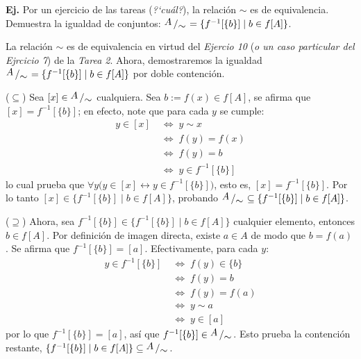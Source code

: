 \documentclass[letterpaper,DIV=14,headsepline,12pt]{scrartcl}
\makeatletter
\newcounter{Ejer}
\newcommand{\pts}{}
\newenvironment{ejercicio}[1]{\noindent
    \ifthenelse{\equal{#1}{1} \OR \equal{#1}{+1}}{\renewcommand{\pts}{\textbf{(#1 pt)}}}{\renewcommand{\pts}{\textbf{(#1 pts)}}}\textbf{Ej. \theEjer} \pts\stepcounter{Ejer}}{\vspace{.3cm}}
\newcommand{\quot}[2]{{\raisebox{.2em}{$#1$}\left/\raisebox{-.2em}{$#2$}\right.}}
\renewenvironment{proof}[1][]{%
        \par\pushQED{\qed}%
        \normalfont\topsep6pt \partopsep0pt %
        \trivlist
        \item[\hskip\labelsep
                \textbf{\textit{Demostración.}}%
        ]#1
        }{%
        \popQED\endtrivlist\@endpefalse
    }
\makeatother
\begin{document}
    \begin{ejercicio}{1.5}\label{ej:rela} Por un ejercicio de las tareas
        (\textit{?`cuál?}), la relación $\sim$ es de equivalencia. Demuestra la
        igualdad de conjuntos: $\quot{A}{\sim}=\{ f^{-1}[\{b\}] \mid b \in f[A]
        \}$.
    \end{ejercicio}
    \begin{proof}
        La relación $\sim$ es de equivalencia en virtud del \textit{Ejercio 10} (\textit{o un caso particular del Ejrcicio 7}) de la \textit{Tarea 2}. Ahora, demostraremos la igualdad $\quot{A}{\sim}=\{ f^{-1}[\{b\}] \mid b \in f[A] \}$ por doble contención.

        ($\subseteq$) Sea $[x] \in \quot{A}{\sim}$ cualquiera. Sea $b:=f(x) \in f[A]$, se afirma que $[x]=f^{-1}[\{b\}]$; en efecto, note que para cada $y$ se cumple:
        \begin{align*}
            y \in [x] & \; \Leftrightarrow \; y \sim x \tag*{(Definición de clase de equivalencia)} \\
            & \; \Leftrightarrow \; f(y)=f(x) \tag*{(Definición de $\sim$)} \\
            & \; \Leftrightarrow \; f(y)=b \tag*{(Definición de $b$)} \\
            & \; \Leftrightarrow \; y \in f^{-1}[\{b\}] \tag*{(Definición de $b$)}
        \end{align*}
        lo cual prueba que $\forall y \big( y \in [x] \leftrightarrow y \in f^{-1}[\{b\}] \big)$, esto es, $[x]=f^{-1}[\{b\}]$. Por lo tanto $[x] \in \{ f^{-1}[\{b\}] \mid b \in f[A] \}$, probando $\quot{A}{\sim} \subseteq \{ f^{-1}[\{b\}] \mid b \in f[A] \}$.

        ($\supseteq$) Ahora, sea $f^{-1}[\{b\}] \in \{ f^{-1}[\{b\}] \mid b \in f[A] \}$ cualquier elemento, entonces $b \in f[A]$. Por definición de imagen directa, existe $a \in A$ de modo que $b=f(a)$. Se afirma que $f^{-1}[\{b\}]=[a]$. Efectivamente, para cada $y$:
        \begin{align*}
            y \in f^{-1}[\{b\}] & \; \Leftrightarrow \; f(y) \in \{b\} \tag*{(Definición de imagen inversa)} \\
            & \; \Leftrightarrow \; f(y)=b \tag*{(Conjunto unitario)} \\
            & \; \Leftrightarrow \; f(y)=f(a) \tag*{(Pues $a=f(b)$)} \\
            & \; \Leftrightarrow \; y \sim a \tag*{(Definición de $\sim$)} \\
            & \; \Leftrightarrow \; y \in [a] \tag*{(Definición de clase de equivalencia)}
        \end{align*}
        por lo que $f^{-1}[\{b\}] =[a]$, así que $f^{-1}[\{b\}] \in \quot{A}{\sim}$. Esto prueba la contención restante, $\{ f^{-1}[\{b\}] \mid b \in f[A] \} \subseteq \quot{A}{\sim}$.
    \end{proof}
\end{document}
